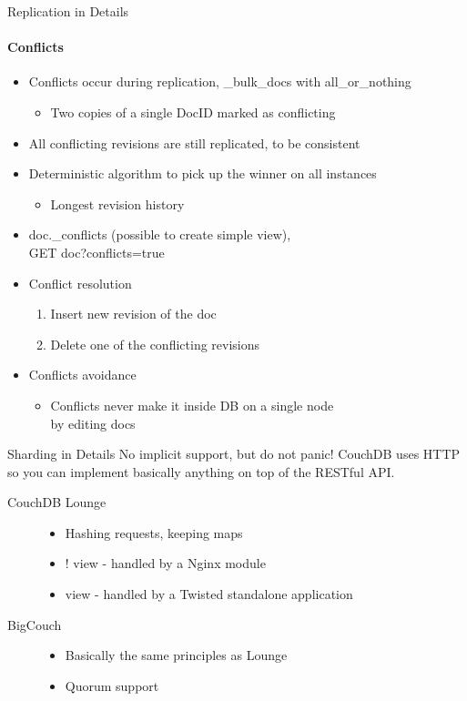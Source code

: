 \documentclass{beamer}
\begin{document}
\begin{frame}{Replication in Details}
  \framesubtitle{Conflicts}
  \begin{itemize}
    \item Conflicts occur during replication, \_bulk\_docs with all\_or\_nothing
    \begin{itemize}
      \item Two copies of a single DocID marked as conflicting
    \end{itemize}
    \item All conflicting revisions are still replicated, to be consistent
    \item Deterministic algorithm to pick up the winner on all instances
    \begin{itemize}
      \item Longest revision history
    \end{itemize}
    \item doc.\_conflicts (possible to create simple view),\\GET doc?conflicts=true
    \item Conflict resolution
    \begin{enumerate}
      \item Insert new revision of the doc
      \item Delete one of the conflicting revisions
    \end{enumerate}
    \item Conflicts avoidance
    \begin{itemize}
      \item Conflicts never make it inside DB on a single node\\by editing docs
    \end{itemize}
  \end{itemize}
\end{frame}

\begin{frame}{Sharding in Details}
  No implicit support, but do not panic! CouchDB uses HTTP so you can implement
  basically anything on top of the RESTful API.
  \begin{description}
    \item[CouchDB Lounge] \hfill
    \begin{itemize}
      \item Hashing requests, keeping maps
      \item ! view - handled by a Nginx module
      \item view - handled by a Twisted standalone application
    \end{itemize}
    \item[BigCouch] \hfill
    \begin{itemize}
      \item Basically the same principles as Lounge
      \item Quorum support
    \end{itemize}
  \end{description}
\end{frame}
\end{document}
